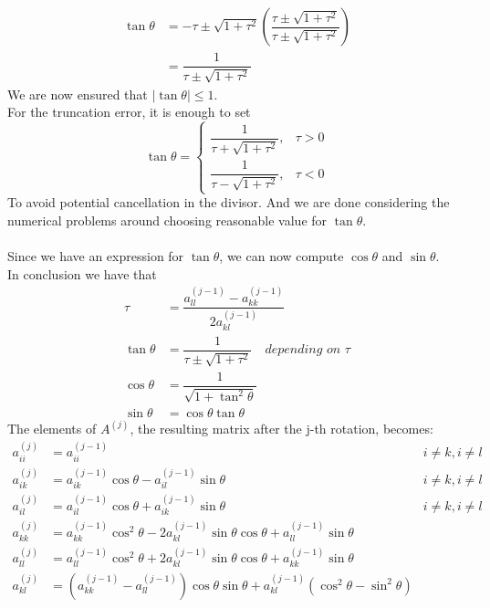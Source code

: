 \documentclass[12pt]{article}
\newcommand\jjj{(j)}
\newcommand\jj{(j-1)}
\begin{document}
	  \begin{align*}
	  	\tan\theta &=  -\tau \pm \sqrt{1+\tau^2}\left
	  	(\dfrac{\tau \pm \sqrt{1+\tau^2}}{\tau \pm \sqrt{1+\tau^2}}\right) \\
	  	&= \dfrac{1}{\tau \pm \sqrt{1+\tau^2}}
	  \end{align*}
	  We are now ensured that $|\tan\theta| \leq 1$. \\
	  For the truncation error, it is enough to set 
	  $$ \tan\theta = 
	  \begin{cases} 
	  \dfrac{1}{\tau + \sqrt{1+\tau^2}}, & \tau > 0 \\
	  \dfrac{1}{\tau - \sqrt{1+\tau^2}}, & \tau < 0
	  \end{cases}
	  $$
	  To avoid potential cancellation in the divisor.  And we are done considering the numerical problems around choosing reasonable value for $\tan\theta$.
	  \\  \\
	  Since we have an expression for $\tan\theta$, we can now compute $\cos\theta$ and $\sin\theta$. \\
	  In conclusion we have that 
	  \begin{align*}
	  	\tau &= \dfrac{a_{ll}^{\jj} - a_{kk}^{\jj}}{2a_{kl}^{\jj}}\\
	  	\tan\theta &= \dfrac{1}{\tau \pm \sqrt{1+\tau^2}} \quad \textit{depending on }\tau \\	
	  	\cos\theta &= \dfrac{1}{\sqrt{1 + \tan^2\theta}} \\
	  	\sin\theta &= \cos\theta\tan\theta 	
	  \end{align*}
	  The elements of $A^{(j)}$, the resulting matrix after the j-th rotation, becomes:  
	  \begin{align*} 
	  	a_{ii}^{\jjj} &= a_{ii}^{\jj}  &i \not = k, i \not = l\\
	  	a_{ik}^{\jjj} &= a_{ik}^{\jj}\cos\theta - a_{il}^{\jj}\sin\theta &i \not = k, i \not = l\\
	  	a_{il}^{\jjj} &= a_{il}^{\jj}\cos\theta + a_{ik}^{\jj}\sin\theta &i \not = k, i \not = l\\
	  	a_{kk}^{\jjj} &= a_{kk}^{\jj}\cos^2\theta - 2a_{kl}^{\jj}\sin\theta\cos\theta + a_{ll}^{\jj}\sin\theta & \\
	  	a_{ll}^{\jjj} &= a_{ll}^{\jj}\cos^2\theta + 2a_{kl}^{\jj}\sin\theta\cos\theta + a_{kk}^{\jj}\sin\theta & \\
	  	a_{kl}^{\jjj} &= (a_{kk}^{\jj} - a_{ll}^{\jj})\cos\theta\sin\theta + a_{kl}^{\jj}(\cos^2\theta - \sin^2\theta)
	  \end{align*}
\end{document}
